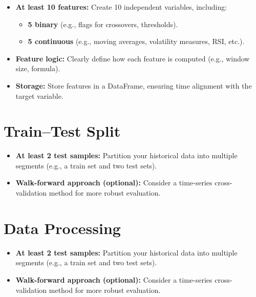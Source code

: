 \documentclass[11pt]{article}
\begin{document}
\begin{itemize}
    \item \textbf{At least 10 features:} Create 10 independent variables, including:
    \begin{itemize}
        \item \textbf{5 binary} (e.g., flags for crossovers, thresholds).
        \item \textbf{5 continuous} (e.g., moving averages, volatility measures, RSI, etc.).
    \end{itemize}
    \item \textbf{Feature logic:} Clearly define how each feature is computed (e.g., window size, formula).
    \item \textbf{Storage:} Store features in a DataFrame, ensuring time alignment with the target variable.
\end{itemize}

\section{Train--Test Split}
\begin{itemize}
    \item \textbf{At least 2 test samples:} Partition your historical data into multiple segments (e.g., a train set and two test sets). 
    \item \textbf{Walk-forward approach (optional):} Consider a time-series cross-validation method for more robust evaluation.
\end{itemize}

\section{Data Processing}
\begin{itemize}
    \item \textbf{At least 2 test samples:} Partition your historical data into multiple segments (e.g., a train set and two test sets). 
    \item \textbf{Walk-forward approach (optional):} Consider a time-series cross-validation method for more robust evaluation.
\end{itemize}
\end{document}
